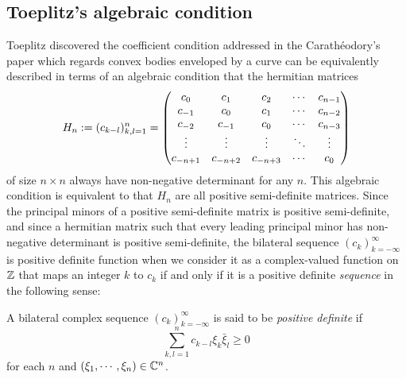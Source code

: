\documentclass[12pt]{article}
\begin{document}
\subsection{Toeplitz's algebraic condition}

Toeplitz discovered the coefficient condition addressed in the Carath\'eodory's paper which regards convex bodies enveloped by a curve can be equivalently described in terms of an algebraic condition that the hermitian matrices
\[H_n:=(c_{k-l})_{k,l=1}^n=\begin{pmatrix}c_0&c_1&c_2&\cdots&c_{n-1}\\c_{-1}&c_0&c_1&\cdots&c_{n-2}\\c_{-2}&c_{-1}&c_0&\cdots&c_{n-3}\\\vdots&\vdots&\vdots&\ddots&\vdots\\c_{-n+1}&c_{-n+2}&c_{-n+3}&\cdots&c_0\end{pmatrix}\]
of size $n\times n$ always have non-negative determinant for any $n$.
This algebraic condition is equivalent to that $H_n$ are all positive semi-definite matrices.
Since the principal minors of a positive semi-definite matrix is positive semi-definite, and since a hermitian matrix such that every leading principal minor has non-negative determinant is positive semi-definite, the bilateral sequence $(c_k)_{k=-\infty}^\infty$ is positive definite function when we consider it as a complex-valued function on $\mathbb{Z}$ that maps an integer $k$ to $c_k$ if and only if it is a positive definite \emph{sequence} in the following sense:

\begin{defn}
A bilateral complex sequence $(c_k)_{k=-\infty}^\infty$ is said to be \emph{positive definite} if
\[\sum_{k,l=1}^nc_{k-l}\xi_k\bar\xi_l\ge0\]
for each $n$ and $(\xi_1,\cdots,\xi_n)\in\mathbb{C}^n$.
\end{defn}
\end{document}
